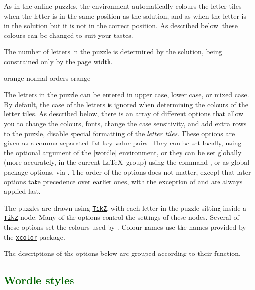\documentclass[svgnames]{report}
\newcommand\ctan[1]{\href{https://www.ctan.org/pkg/#1}{\texttt{#1}}}
\newcommand\Section[1]{\subsection{\textcolor{DarkGreen}{#1}}}
\begin{document}
  As in the online puzzles, the  environment
  automatically colours the letter tiles
  when the letter is in the same position as the solution, and as
   when
  the letter is in the solution but it is not in the correct position. As
  described below, these colours can be changed to suit your tastes.

  The number of letters in the puzzle is determined by the solution,
  being constrained only by the page width.

  \begin{example}
    \begin{wordle}[rows=4]{orange}
       normal
       orders
       orange
    \end{wordle}
  \end{example}

  The letters in the puzzle can be entered in upper case, lower case, or
  mixed case. By default, the case of the letters is ignored when
  determining the colours of the letter tiles. As described below, there is an array of
  different options that allow you to  change the colours, fonts, change
  the case sensitivity, and add extra rows to the puzzle, disable
  special formatting of the \textit{letter tiles}.
  These options are given as a comma separated list key-value pairs.
  They can be set locally, using the optional argument of the
  \keyword|wordle| environment, or they can be set globally (more
  accurately, in the current \LaTeX\ group) using the
  \keyword{\WordleSetup} command , or
  as global package options, via \keyword{\usepackage[options]{wordle}}.
  The order of the options does not matter, except that later options
  take precedence over earlier ones, with the exception of 
  and  are always applied last.

  The  puzzles are drawn using \ctan{TikZ}, with each
  letter in the puzzle sitting inside a \ctan{TikZ} node. Many of the
  options control the settings of these nodes. Several of these options
  set the colours used by . Colour names use the
   names provided by the \ctan{xcolor} package.

  The descriptions of the options below are grouped according to their
  function.

  \Section{Wordle styles}
\end{document}
